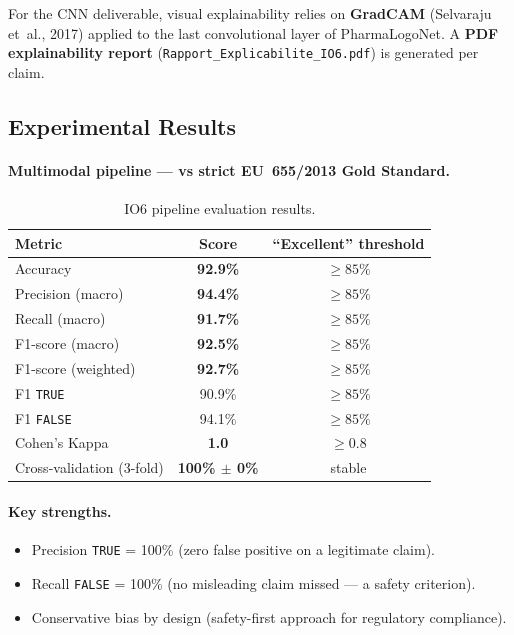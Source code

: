 \documentclass[11pt,a4paper]{article}
\newcommand{\verdict}[1]{\texttt{#1}}
\begin{document}
\noindent For the CNN deliverable, visual explainability relies on \textbf{GradCAM}
(Selvaraju et~al., 2017) applied to the last convolutional layer of
PharmaLogoNet. A \textbf{PDF explainability report}
(\texttt{Rapport\_Explicabilite\_IO6.pdf}) is generated per claim.

\subsection{Experimental Results}

\paragraph{Multimodal pipeline --- vs strict EU~655/2013 Gold Standard.}

\begin{table}[h]
\centering
\small
\begin{tabular}{l c c}
\toprule
\textbf{Metric} & \textbf{Score} & \textbf{``Excellent'' threshold} \\
\midrule
Accuracy                    & \textbf{92.9\%} & $\ge 85\%$ \\
Precision (macro)           & \textbf{94.4\%} & $\ge 85\%$ \\
Recall (macro)              & \textbf{91.7\%} & $\ge 85\%$ \\
F1-score (macro)            & \textbf{92.5\%} & $\ge 85\%$ \\
F1-score (weighted)         & \textbf{92.7\%} & $\ge 85\%$ \\
F1 \verdict{TRUE}           & 90.9\%          & $\ge 85\%$ \\
F1 \verdict{FALSE}          & 94.1\%          & $\ge 85\%$ \\
Cohen's Kappa               & \textbf{1.0}    & $\ge 0.8$ \\
Cross-validation (3-fold)   & \textbf{100\% $\pm$ 0\%} & stable \\
\bottomrule
\end{tabular}
\caption{IO6 pipeline evaluation results.}
\end{table}

\paragraph{Key strengths.}
\begin{itemize}[noitemsep]
  \item Precision \verdict{TRUE} = 100\% (zero false positive on a legitimate
  claim).
  \item Recall \verdict{FALSE} = 100\% (no misleading claim missed --- a safety
  criterion).
  \item Conservative bias by design (safety-first approach for regulatory
  compliance).
\end{itemize}
\end{document}
